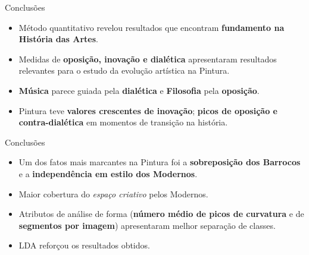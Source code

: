 \documentclass{beamer}
\begin{document}
\begin{frame}{Conclusões}
\begin{itemize}
  \item<1> Método quantitativo revelou resultados que encontram \textbf{fundamento na História das Artes}.

  \item<2> Medidas de \textbf{oposição, inovação e dialética} apresentaram resultados relevantes para o estudo da evolução artística na Pintura.

  \item<3> \textbf{Música} parece guiada pela \textbf{dialética} e \textbf{Filosofia} pela \textbf{oposição}.

  \item<4> Pintura teve \textbf{valores crescentes de inovação}; \textbf{picos de oposição e contra-dialética} em momentos de transição na história.
\end{itemize}

\end{frame}

\begin{frame}{Conclusões}
\begin{itemize}
  \item<1> Um dos fatos mais marcantes na Pintura foi a \textbf{sobreposição dos Barrocos} e a \textbf{independência em estilo dos Modernos}.

  \item<2> Maior cobertura do \textit{espaço criativo} pelos Modernos.

  \item<3> Atributos de análise de forma (\textbf{número médio de picos de curvatura} e de \textbf{segmentos por imagem}) apresentaram melhor separação de classes.

  \item<4> LDA reforçou os resultados obtidos.
\end{itemize}

\end{frame}
\end{document}
